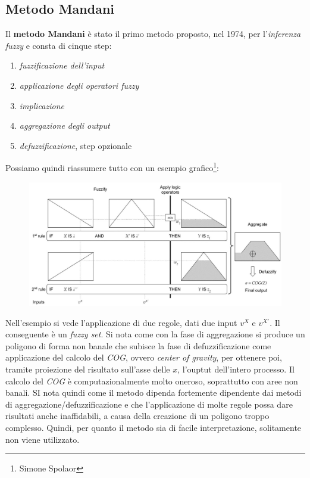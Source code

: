 \documentclass[a4paper,12pt, oneside]{book}
\begin{document}
\subsection{Metodo Mandani}
Il \textbf{metodo Mandani} è stato il primo metodo proposto, nel 1974, per
l'\textit{inferenza fuzzy} e consta di cinque step:
\begin{enumerate}
  \item \textit{fuzzificazione dell'input}
  \item \textit{applicazione degli operatori fuzzy}
  \item \textit{implicazione}
  \item \textit{aggregazione degli output}
  \item \textit{defuzzificazione}, step opzionale
\end{enumerate}
Possiamo quindi riassumere tutto con un esempio grafico\footnote{Simone
  Spolaor}: 
\begin{figure}[H]
  \centering
  \includegraphics[scale = 0.27]{img/mandani.jpg}
\end{figure}
Nell'esempio si vede l'applicazione di due regole, dati due input $v^X$ e
$v^{X'}$. Il conseguente è un \textit{fuzzy set}. Si nota come con la fase di
aggregazione si produce un poligono di 
forma non banale che subisce la fase di defuzzificazione come applicazione del
calcolo del \textit{COG}, ovvero \textit{center of gravity}, per ottenere poi,
tramite proiezione del risultato sull'asse delle $x$, l'ouptut dell'intero
processo. Il calcolo del \textit{COG} è computazionalmente molto oneroso,
soprattutto con aree non banali. SI
nota quindi come il metodo dipenda fortemente dipendente dai metodi di
aggregazione/defuzzificazione e che l'applicazione di molte regole possa dare
risultati anche inaffidabili, a causa della creazione di un poligono troppo
complesso. Quindi, per quanto il metodo sia di facile interpretazione,
solitamente non viene utilizzato.
\newpage
\end{document}
